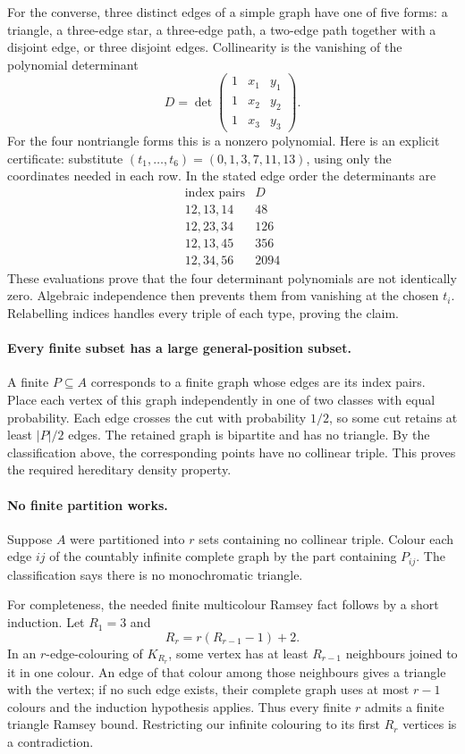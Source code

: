 For the converse, three distinct edges of a simple graph have one of five forms: a triangle, a three-edge star, a three-edge path, a two-edge path together with a disjoint edge, or three disjoint edges. Collinearity is the vanishing of the polynomial determinant
\[
 D=\det\begin{pmatrix}1&x_1&y_1\\1&x_2&y_2\\1&x_3&y_3\end{pmatrix}.
\]
For the four nontriangle forms this is a nonzero polynomial. Here is an explicit certificate: substitute \((t_1,\ldots,t_6)=(0,1,3,7,11,13)\), using only the coordinates needed in each row. In the stated edge order the determinants are
\[
\begin{array}{c|r}
\text{index pairs}&D\\ \hline
12,13,14&48\\
12,23,34&126\\
12,13,45&356\\
12,34,56&2094
\end{array}
\]
These evaluations prove that the four determinant polynomials are not identically zero. Algebraic independence then prevents them from vanishing at the chosen \(t_i\). Relabelling indices handles every triple of each type, proving the claim.

\paragraph{Every finite subset has a large general-position subset.}
A finite \(P\subseteq A\) corresponds to a finite graph whose edges are its index pairs. Place each vertex of this graph independently in one of two classes with equal probability. Each edge crosses the cut with probability \(1/2\), so some cut retains at least \(|P|/2\) edges. The retained graph is bipartite and has no triangle. By the classification above, the corresponding points have no collinear triple. This proves the required hereditary density property.

\paragraph{No finite partition works.}
Suppose \(A\) were partitioned into \(r\) sets containing no collinear triple. Colour each edge \(ij\) of the countably infinite complete graph by the part containing \(P_{ij}\). The classification says there is no monochromatic triangle.

For completeness, the needed finite multicolour Ramsey fact follows by a short induction. Let \(R_1=3\) and
\[
 R_r=r(R_{r-1}-1)+2.
\]
In an \(r\)-edge-colouring of \(K_{R_r}\), some vertex has at least \(R_{r-1}\) neighbours joined to it in one colour. An edge of that colour among those neighbours gives a triangle with the vertex; if no such edge exists, their complete graph uses at most \(r-1\) colours and the induction hypothesis applies. Thus every finite \(r\) admits a finite triangle Ramsey bound. Restricting our infinite colouring to its first \(R_r\) vertices is a contradiction.

